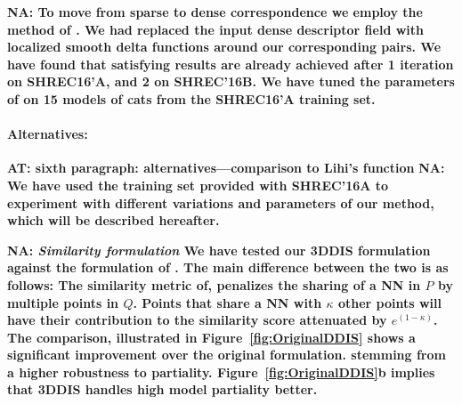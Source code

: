 \documentclass[10pt,twocolumn,letterpaper]{article}
\newcommand{\colornote}[3]{{\color{#1}\bf{#2: #3}\normalfont}}
\newcommand{\colornote}[3]{}
\newcommand {\ayellet}[1]{\colornote{blue}{AT}{#1}}
\newcommand {\nadav}[1]{\colornote{red}{NA}{#1}}
\begin{document}
\nadav{
To move from sparse to dense correspondence we employ the method of \cite{litany2017fully}. 
We had replaced the input dense descriptor field with localized smooth delta functions around our corresponding pairs.
We have found that satisfying results are already achieved after 1 iteration on SHREC16'A, and 2 on SHREC'16B. We have tuned the parameters of \cite{litany2017fully} on 15 models of cats from the SHREC16'A training set.}


\paragraph{Alternatives:} 
\ayellet{sixth paragraph: alternatives---comparison to Lihi's function}
\nadav{ We have used the training set provided with SHREC'16A to experiment with different variations and parameters of our method, which will be described hereafter.}

\nadav{
\textit{Similarity formulation}	We have tested our 3DDIS formulation against the formulation of \cite{talmi2017template}. 
The main difference between the two is as follows:
The similarity metric of\cite{talmi2017template}, penalizes the sharing of a NN in $P$ by multiple points in $Q$. 
Points that share a NN with $\kappa$ other points will have their contribution to the similarity score attenuated by $e^{(1-\kappa)}$. The comparison, illustrated in Figure~\ref{fig:OriginalDDIS} shows a significant improvement over the original formulation. stemming from a higher robustness to partiality. Figure~\ref{fig:OriginalDDIS}b implies that 3DDIS handles high model partiality better.}
\end{document}
